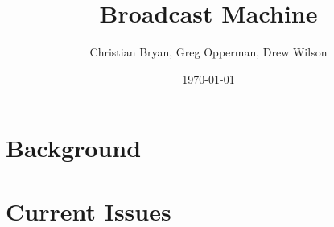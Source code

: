 \documentclass[a4paper,12pt]{report}
\author{Christian Bryan, Greg Opperman, Drew Wilson}
\date{\today}
\title{Broadcast Machine}
\begin{document}
\maketitle

\tableofcontents

\chapter{Background}

\begin{comment}
* Importance of open media and an open internet for open media.
	* A brief history of the software and PCF.
	* How Broadcast Machine relates to similar software such as:
		> WordPress
		> Drupal
		> YouTube
	* Why Broadcast Machine will be built in PHP/MySQL versus Ruby on Rails, J2EE, and other PHP frameworks.
\end{comment}

\chapter{Current Issues}
	
	
\end{document}
